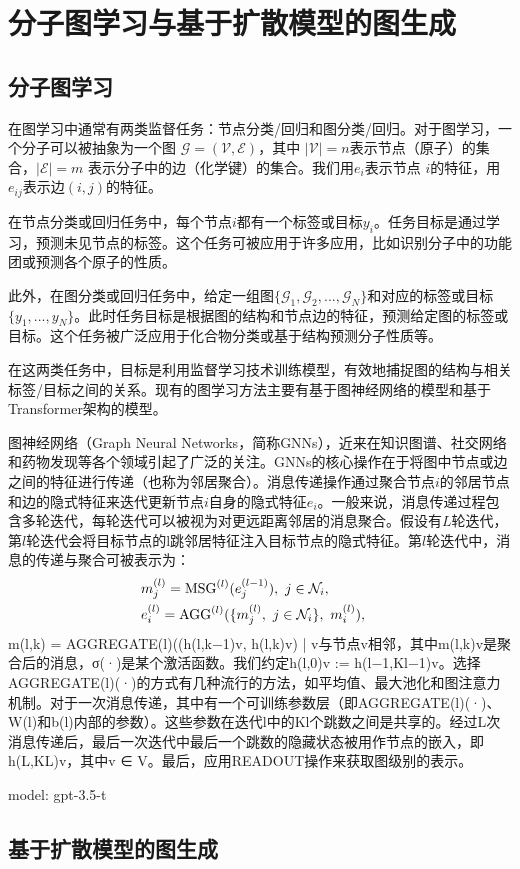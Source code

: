 \chapter[分子图学习与基于扩散模型的图生成]{分子图学习与基于扩散模型的图生成}
\label{chap:diffusion-based_molgen}

\section{分子图学习}
在图学习中通常有两类监督任务：节点分类/回归和图分类/回归。对于图学习，一个分子可以被抽象为一个图 $\mathcal{G} = (\mathcal{V}, \mathcal{E})$，其中 $|\mathcal{V}| = n$表示节点（原子）的集合，$|\mathcal{E}| = m$ 表示分子中的边（化学键）的集合。我们用$e_i$表示节点 $i$的特征，用$e_{ij}$表示边$(i, j)$的特征。

在节点分类或回归任务中，每个节点$i$都有一个标签或目标$y_i$。任务目标是通过学习，预测未见节点的标签。这个任务可被应用于许多应用，比如识别分子中的功能团或预测各个原子的性质。

此外，在图分类或回归任务中，给定一组图$\{ \mathcal{G}_1, \mathcal{G}_2, ..., \mathcal{G}_N \}$和对应的标签或目标 $\{ y_1, ..., y_N \}$。此时任务目标是根据图的结构和节点边的特征，预测给定图的标签或目标。这个任务被广泛应用于化合物分类或基于结构预测分子性质等。

在这两类任务中，目标是利用监督学习技术训练模型，有效地捕捉图的结构与相关标签/目标之间的关系。现有的图学习方法主要有基于图神经网络的模型和基于Transformer架构的模型。

图神经网络（Graph Neural Networks，简称GNNs），近来在知识图谱、社交网络和药物发现等各个领域引起了广泛的关注。GNNs的核心操作在于将图中节点或边之间的特征进行传递（也称为邻居聚合）。消息传递操作通过聚合节点$i$的邻居节点和边的隐式特征来迭代更新节点$i$自身的隐式特征$e_i$。一般来说，消息传递过程包含多轮迭代，每轮迭代可以被视为对更远距离邻居的消息聚合。假设有$L$轮迭代，第$l$轮迭代会将目标节点的l跳邻居特征注入目标节点的隐式特征。第$l$轮迭代中，消息的传递与聚合可被表示为：
\begin{eqnarray}
    &m_j^{(l)} = {\rm MSG}^{(l)}(e_j^{(l-1)}), \ j \in \mathcal{N}_i, & \\
    &e_i^{(l)} = {\rm AGG}^{(l)}(\{ m_j^{(l)}, \ j \in \mathcal{N}_i \}, \ m_i^{(l)} ), &
\end{eqnarray}
m(l,k) = AGGREGATE(l)({(h(l,k−1)v, h(l,k)v) | v与节点v相邻}，其中m(l,k)v是聚合后的消息，σ(·)是某个激活函数。我们约定h(l,0)v := h(l−1,Kl−1)v。选择AGGREGATE(l)(·)的方式有几种流行的方法，如平均值、最大池化和图注意力机制。对于一次消息传递，其中有一个可训练参数层（即AGGREGATE(l)(·)、W(l)和b(l)内部的参数）。这些参数在迭代l中的Kl个跳数之间是共享的。经过L次消息传递后，最后一次迭代中最后一个跳数的隐藏状态被用作节点的嵌入，即h(L,KL)v，其中v ∈ V。最后，应用READOUT操作来获取图级别的表示。

model: gpt-3.5-t

\section{基于扩散模型的图生成}